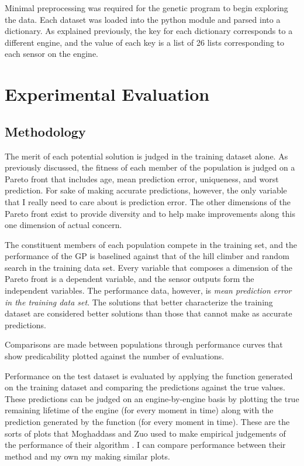 \documentclass{acm_proc_article-sp}
\begin{document}
Minimal preprocessing was required for the genetic program to begin exploring the data. Each dataset was loaded into the python module and parsed into a dictionary. As explained previously, the key for each dictionary corresponds to a different engine, and the value of each key is a list of 26 lists corresponding to each sensor on the engine.

\section{Experimental Evaluation}
\subsection{Methodology}
The merit of each potential solution is judged in the training dataset alone. As previously discussed, the fitness of each member of the population is judged on a Pareto front that includes age, mean prediction error, uniqueness, and worst prediction. For sake of making accurate predictions, however, the only variable that I really need to care about is prediction error. The other dimensions of the Pareto front exist to provide diversity and to help make improvements along this one dimension of actual concern.

The constituent members of each population compete in the training set, and the performance of the GP is baselined against that of the hill climber and random search in the training data set. Every variable that composes a dimension of the Pareto front is a dependent variable, and the sensor outputs form the independent variables. The performance data, however, is {\it{mean prediction error in the training data set}}. The solutions that better characterize the training dataset are considered better solutions than those that cannot make as accurate predictions.

Comparisons are made between populations through performance curves that show predicability plotted against the number of evaluations.

Performance on the test dataset is evaluated by applying the function generated on the training dataset and comparing the predictions against the true values. These predictions can be judged on an engine-by-engine basis by plotting the true remaining lifetime of the engine (for every moment in time) along with the prediction generated by the function (for every moment in time). These are the sorts of plots that Moghaddass and Zuo used to make empirical judgements of the performance of their algorithm \cite{Mog}. I can compare performance between their method and my own my making similar plots.
\end{document}
